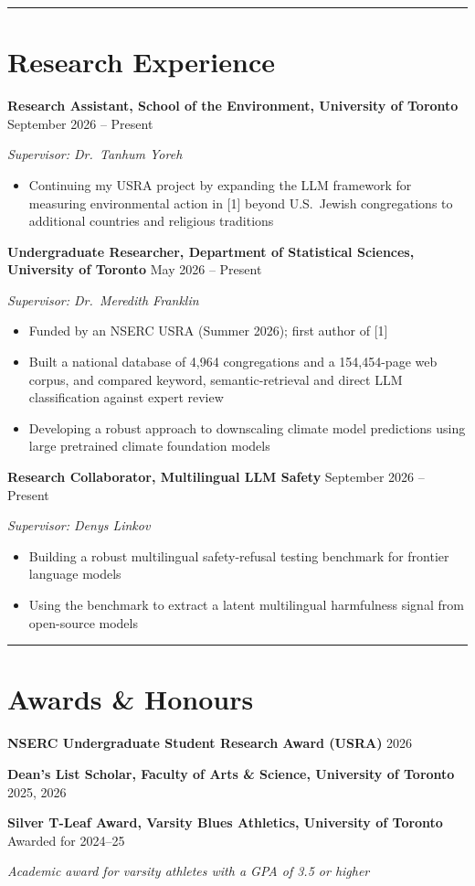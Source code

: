 \documentclass[11pt,letterpaper]{article}
\let\oldsection\section
\renewcommand{\section}[1]{\par\needspace{6\baselineskip}\vspace{4pt}\noindent\rule{\textwidth}{0.4pt}\par\oldsection*{#1}}
\newcommand{\entry}[2]{\textbf{#1} \hfill #2\par}
\newcommand{\supervisor}[1]{\textit{Supervisor: #1}\par}
\begin{document}
\section{Research Experience}

\entry{Research Assistant, School of the Environment, University of Toronto}{September 2026 -- Present}
\supervisor{Dr.~Tanhum Yoreh}
\begin{itemize}
  \item Continuing my USRA project by expanding the LLM framework for measuring environmental action in [1] beyond U.S.\ Jewish congregations to additional countries and religious traditions
\end{itemize}

\entry{Undergraduate Researcher, Department of Statistical Sciences, University of Toronto}{May 2026 -- Present}
\supervisor{Dr.~Meredith Franklin}
\begin{itemize}
  \item Funded by an NSERC USRA (Summer 2026); first author of [1]
  \item Built a national database of 4,964 congregations and a 154,454-page web corpus, and compared keyword, semantic-retrieval and direct LLM classification against expert review
  \item Developing a robust approach to downscaling climate model predictions using large pretrained climate foundation models
\end{itemize}

\entry{Research Collaborator, Multilingual LLM Safety}{September 2026 -- Present}
\supervisor{Denys Linkov}
\begin{itemize}
  \item Building a robust multilingual safety-refusal testing benchmark for frontier language models
  \item Using the benchmark to extract a latent multilingual harmfulness signal from open-source models
\end{itemize}

\section{Awards \& Honours}
\entry{NSERC Undergraduate Student Research Award (USRA)}{2026}
\entry{Dean's List Scholar, Faculty of Arts \& Science, University of Toronto}{2025, 2026}
\entry{Silver T-Leaf Award, Varsity Blues Athletics, University of Toronto}{Awarded for 2024--25}
\hspace{1.5em}\textit{Academic award for varsity athletes with a GPA of 3.5 or higher}\par
\end{document}

